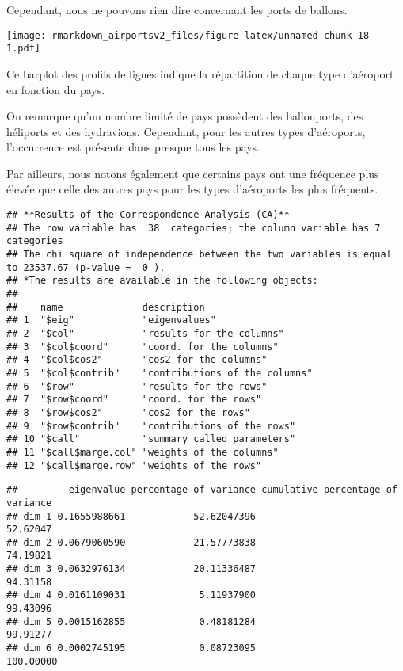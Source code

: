 \documentclass[
]{compterendu}
\begin{document}
Cependant, nous ne pouvons rien dire concernant les ports de ballons.

\texttt{[image: rmarkdown\_airportsv2\_files/figure-latex/unnamed-chunk-18-1.pdf]}

Ce barplot des profils de lignes indique la répartition de chaque type
d'aéroport en fonction du pays.

On remarque qu'un nombre limité de pays possèdent des ballonports, des
héliports et des hydravions. Cependant, pour les autres types
d'aéroports, l'occurrence est présente dans presque tous les pays.

Par ailleurs, nous notons également que certains pays ont une fréquence
plus élevée que celle des autres pays pour les types d'aéroports les
plus fréquents.

\begin{verbatim}
## **Results of the Correspondence Analysis (CA)**
## The row variable has  38  categories; the column variable has 7 categories
## The chi square of independence between the two variables is equal to 23537.67 (p-value =  0 ).
## *The results are available in the following objects:
## 
##    name              description                   
## 1  "$eig"            "eigenvalues"                 
## 2  "$col"            "results for the columns"     
## 3  "$col$coord"      "coord. for the columns"      
## 4  "$col$cos2"       "cos2 for the columns"        
## 5  "$col$contrib"    "contributions of the columns"
## 6  "$row"            "results for the rows"        
## 7  "$row$coord"      "coord. for the rows"         
## 8  "$row$cos2"       "cos2 for the rows"           
## 9  "$row$contrib"    "contributions of the rows"   
## 10 "$call"           "summary called parameters"   
## 11 "$call$marge.col" "weights of the columns"      
## 12 "$call$marge.row" "weights of the rows"
\end{verbatim}

\begin{verbatim}
##         eigenvalue percentage of variance cumulative percentage of variance
## dim 1 0.1655988661            52.62047396                          52.62047
## dim 2 0.0679060590            21.57773838                          74.19821
## dim 3 0.0632976134            20.11336487                          94.31158
## dim 4 0.0161109031             5.11937900                          99.43096
## dim 5 0.0015162855             0.48181284                          99.91277
## dim 6 0.0002745195             0.08723095                         100.00000
\end{verbatim}
\end{document}
